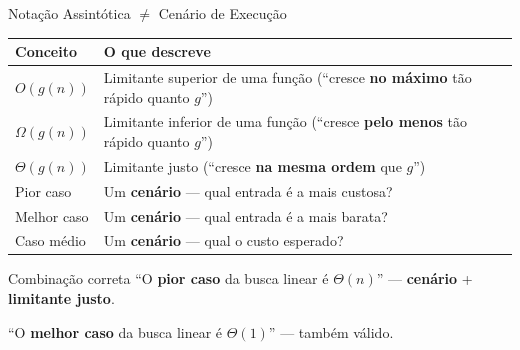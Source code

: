 \documentclass[aspectratio=169]{beamer}
\begin{document}
\begin{frame}[shrink]{Notação Assintótica $\neq$ Cenário de Execução}

    \centering
    \begin{tabular}{@{}lp{6.5cm}@{}}
        \toprule
        \textbf{Conceito} & \textbf{O que descreve} \\
        \midrule
        $O(g(n))$      & Limitante superior de uma função
                          (``cresce \textbf{no máximo} tão rápido quanto $g$'') \\[4pt]
        $\Omega(g(n))$  & Limitante inferior de uma função
                          (``cresce \textbf{pelo menos} tão rápido quanto $g$'') \\[4pt]
        $\Theta(g(n))$  & Limitante justo
                          (``cresce \textbf{na mesma ordem} que $g$'') \\
        \midrule
        Pior caso       & Um \textbf{cenário} --- qual entrada é a mais custosa? \\
        Melhor caso     & Um \textbf{cenário} --- qual entrada é a mais barata? \\
        Caso médio      & Um \textbf{cenário} --- qual o custo esperado? \\
        \bottomrule
    \end{tabular}

    \bigskip

    \begin{exampleblock}{Combinação correta}
        ``O \textbf{pior caso} da busca linear é $\Theta(n)$'' \;---\;
        \textbf{cenário} + \textbf{limitante justo}.

        \smallskip
        ``O \textbf{melhor caso} da busca linear é $\Theta(1)$'' \;---\;
        também válido.
    \end{exampleblock}
\end{frame}
\end{document}
